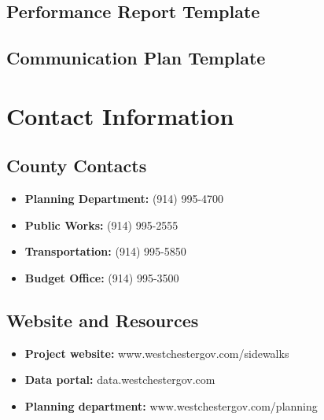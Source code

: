 \documentclass[11pt,letterpaper]{article}
\begin{document}
\subsection{Performance Report Template}
\subsection{Communication Plan Template}

\section{Contact Information}

\subsection{County Contacts}
\begin{itemize}
    \item \textbf{Planning Department:} (914) 995-4700
    \item \textbf{Public Works:} (914) 995-2555
    \item \textbf{Transportation:} (914) 995-5850
    \item \textbf{Budget Office:} (914) 995-3500
\end{itemize}

\subsection{Website and Resources}
\begin{itemize}
    \item \textbf{Project website:} www.westchestergov.com/sidewalks
    \item \textbf{Data portal:} data.westchestergov.com
    \item \textbf{Planning department:} www.westchestergov.com/planning
\end{itemize}
\end{document}
